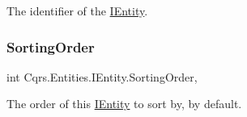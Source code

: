 The identifier of the \hyperlink{interfaceCqrs_1_1Entities_1_1IEntity}{I\+Entity}. 

\mbox{\label{interfaceCqrs_1_1Entities_1_1IEntity_a3de43465f8acc41ff10fd69a8c060225_a3de43465f8acc41ff10fd69a8c060225}} 
\subsubsection{\texorpdfstring{Sorting\+Order}{SortingOrder}}
{\footnotesize\ttfamily int Cqrs.\+Entities.\+I\+Entity.\+Sorting\+Order\hspace{0.3cm}{\ttfamily [get]}, {\ttfamily [set]}}



The order of this \hyperlink{interfaceCqrs_1_1Entities_1_1IEntity}{I\+Entity} to sort by, by default. 

